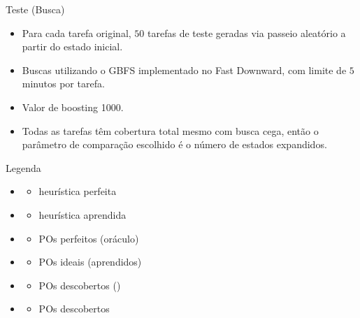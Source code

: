 \documentclass{beamer}
\begin{document}
\begin{frame}{Teste (Busca)}
\begin{itemize}
  \item Para cada tarefa original, \alert{$50$ tarefas de teste} geradas via passeio aleatório a partir do estado inicial.
  \pause
  \item Buscas utilizando o GBFS implementado no Fast Downward, com limite de \alert{$5$ minutos} por tarefa.
  \pause
  \item Valor de \alert{boosting 1000}.
  \pause
  \item Todas as tarefas têm cobertura total mesmo com busca cega, então o parâmetro de comparação escolhido é o \alert{número de estados expandidos}.
\end{itemize}
\end{frame}

\begin{frame}{Legenda}
\begin{multicols}{2}
\begin{itemize}
  \item \hstar
    \begin{itemize}
      \item heurística perfeita
    \end{itemize}
  \item \hnn
    \begin{itemize}
      \item heurística aprendida
    \end{itemize}
  \item \postartable
    \begin{itemize}
      \item POs perfeitos (oráculo)
    \end{itemize}
  \item \postar
    \begin{itemize}
      \item POs ideais (aprendidos)
    \end{itemize}
  \item \pogstar
    \begin{itemize}
      \item POs descobertos (\hstar)
    \end{itemize}
  \item \alert{\pog}
    \begin{itemize}
      \item POs descobertos
    \end{itemize}

\end{itemize}
\end{multicols}
\end{frame}
\end{document}
